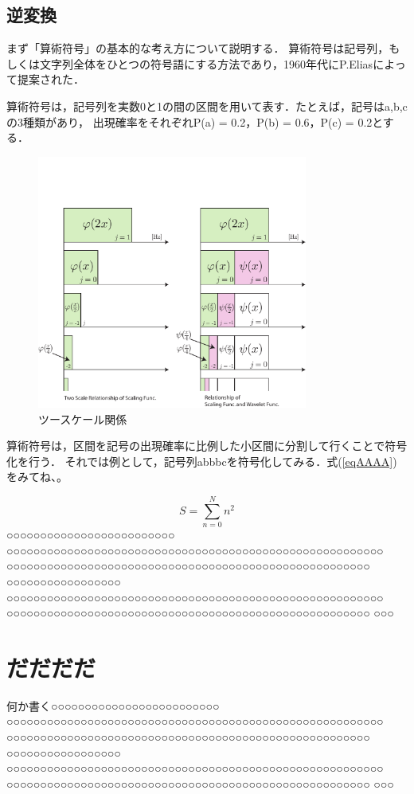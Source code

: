 \subsection{逆変換}\label{QWERT}
まず「算術符号」の基本的な考え方について説明する．
算術符号は記号列，もしくは文字列全体をひとつの符号語にする方法であり，1960年代にP.Eliasによって提案された．\par
算術符号は，記号列を実数0と1の間の区間を用いて表す．たとえば，記号は{a,b,c}の3種類があり，
出現確率をそれぞれP(a) = 0.2，P(b) = 0.6，P(c) = 0.2とする．
\begin{figure}[htbp]
\begin{center}
\includegraphics[width=3.5in]{chap1/fig/two-scale.pdf}
\caption{ツースケール関係} \label{fig-two-scale.pdf}
\end{center}
\end{figure}
算術符号は，区間を記号の出現確率に比例した小区間に分割して行くことで符号化を行う．
それでは例として，記号列abbbcを符号化してみる．式(\ref{eqAAAA})をみてね、。

\begin{equation}
S=\sum_{n=0}^N n^2 \label{eqAAAA}
\end{equation}
○○○○○○○○○○○○○○○○○○○○○○○○○ ○○○○○○○○○○○○○○○○○○○○○○○○○○○○○○○○○○○○○○○○○○○○○○○○○○○○○○○○ ○○○○○○○○○○○○○○○○○○○○○○○○○○○○○○○○○○○○○○○○○○○○○○○○○○○○○○ ○○○○○○○○○○○○○○○○○ ○○○○○○○○○○○○○○○○○○○○○○○○○○○○○○○○○○○○○○○○○○○○○○○○○○○○○○○○ ○○○○○○○○○○○○○○○○○○○○○○○○○○○○○○○○○○○○○○○○○○○○○○○○○○○○○○ ○○○
\section{だだだだ}
何か書く○○○○○○○○○○○○○○○○○○○○○○○○○ ○○○○○○○○○○○○○○○○○○○○○○○○○○○○○○○○○○○○○○○○○○○○○○○○○○○○○○○○ ○○○○○○○○○○○○○○○○○○○○○○○○○○○○○○○○○○○○○○○○○○○○○○○○○○○○○○ ○○○○○○○○○○○○○○○○○ ○○○○○○○○○○○○○○○○○○○○○○○○○○○○○○○○○○○○○○○○○○○○○○○○○○○○○○○○ ○○○○○○○○○○○○○○○○○○○○○○○○○○○○○○○○○○○○○○○○○○○○○○○○○○○○○○ ○○○
